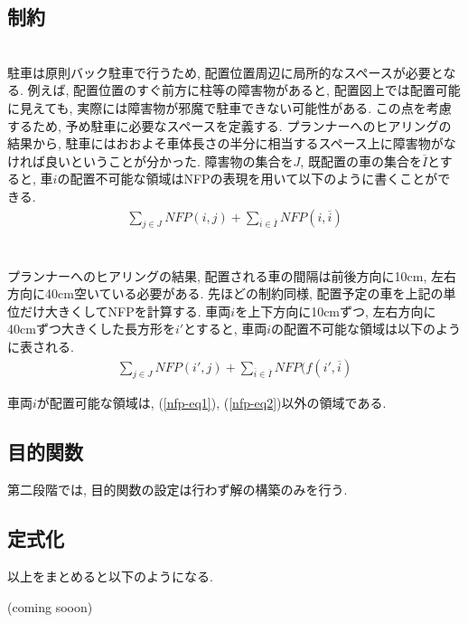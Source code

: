 \subsection{制約}
\\
駐車は原則バック駐車で行うため, 配置位置周辺に局所的なスペースが必要となる. 
例えば, 配置位置のすぐ前方に柱等の障害物があると, 配置図上では配置可能に見えても, 実際には障害物が邪魔で駐車できない可能性がある.
この点を考慮するため, 予め駐車に必要なスペースを定義する.
プランナーへのヒアリングの結果から, 駐車にはおおよそ車体長さの半分に相当するスペース上に障害物がなければ良いということが分かった. 
障害物の集合を$J$, 既配置の車の集合を$\overline{I}$とすると, 車$i$の配置不可能な領域はNFPの表現を用いて以下のように書くことができる.  
\begin{eqnarray}
    \label{nfp-eq1}
    \sum_{j \in J} NFP(i,j) + \sum_{\overline{i} \in \overline{I}} NFP(i,\overline{i})
\end{eqnarray}\\

\\
プランナーへのヒアリングの結果, 配置される車の間隔は前後方向に10cm, 左右方向に40cm空いている必要がある. 
先ほどの制約同様, 配置予定の車を上記の単位だけ大きくしてNFPを計算する. 
車両$i$を上下方向に10cmずつ, 左右方向に40cmずつ大きくした長方形を$i'$とすると, 車両$i$の配置不可能な領域は以下のように表される. 
\begin{eqnarray}
    \label{nfp-eq2}
    \sum_{j \in J} NFP(i',j) + \sum_{\overline{i} \in \overline{I}} NFP(f(i',\overline{i})
\end{eqnarray}

車両$i$が配置可能な領域は, (\ref{nfp-eq1}), (\ref{nfp-eq2})以外の領域である. 

\subsection{目的関数}
第二段階では, 目的関数の設定は行わず解の構築のみを行う. 

\subsection{定式化}
以上をまとめると以下のようになる. \\
\centerline{(coming sooon)}

